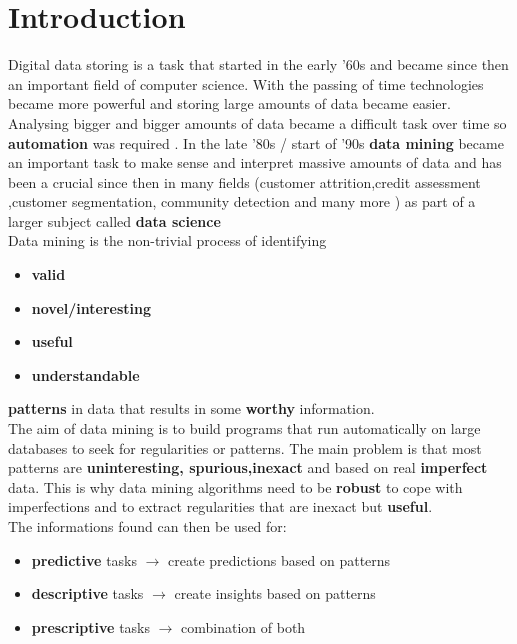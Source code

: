 \section{Introduction}
Digital data storing is a task that started in the early '60s and became since then an important field of computer science. With the passing of time technologies became more powerful and storing large amounts of data became easier.\\
Analysing bigger and bigger amounts of data became a difficult task over time so \textbf{automation} was required . In the late '80s / start of '90s \textbf{data mining} became an important task to make sense and interpret  massive amounts of data and has been a crucial since then in many fields (customer attrition,credit assessment ,customer segmentation, community detection and many more ) as part of a larger subject called \textbf{data science}\\
Data mining is the non-trivial process of identifying
\begin{itemize}
\item \textbf{valid}
\item \textbf{novel/interesting}
\item \textbf{useful}
\item \textbf{understandable}
\end{itemize}
\textbf{patterns} in data that results in some \textbf{worthy} information.\\
The aim of data mining is to build programs that run automatically on large databases to seek for regularities or patterns. The main problem is that most patterns are \textbf{uninteresting, spurious,inexact} and based on real \textbf{imperfect} data.
This is why data mining algorithms need to be \textbf{robust} to cope with imperfections and to extract regularities that are inexact but \textbf{useful}.\\
The informations found can then be used for:
\begin{itemize}
\item \textbf{predictive} tasks $\to$ create predictions based on patterns
\item \textbf{descriptive} tasks $\to$ create insights based on patterns
\item \textbf{prescriptive} tasks $\to$ combination of both
\end{itemize}
\newpage
